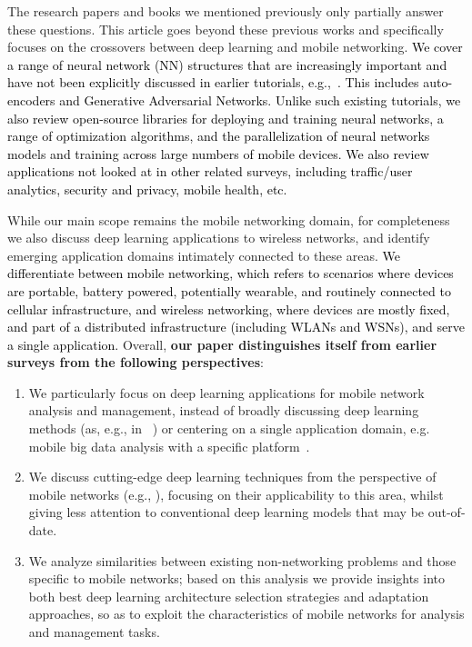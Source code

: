 \documentclass[journal,comsoc,letter]{IEEEtran}
\newcommand{\edit}[1]{\textcolor{black}{#1}}
\begin{document}
The research papers and books we mentioned previously only partially answer these questions.  This article goes beyond these previous works and specifically focuses on the crossovers between deep learning and mobile networking. \edit{We cover a range of neural network (NN) structures that are increasingly important and have not been explicitly discussed in earlier tutorials, e.g.,~\cite{chen2018deep0}. This includes auto-encoders and Generative Adversarial Networks. Unlike such existing tutorials, we also review open-source libraries for deploying and training neural networks, a range of optimization algorithms, and the parallelization of neural networks models and training across large numbers of mobile devices. We also review applications not looked at in other related surveys, including traffic/user analytics, security and privacy, mobile health, etc.} 

While our main scope remains the mobile networking domain, for completeness we also discuss deep learning applications to wireless networks, and identify emerging application domains intimately connected to these areas. \edit{We differentiate between mobile networking, which refers to scenarios where devices are portable, battery powered, potentially wearable, and routinely connected to cellular infrastructure, and wireless networking, where devices are mostly fixed, and part of a distributed infrastructure (including WLANs and WSNs), and serve a single application.} Overall, \textbf{our paper distinguishes itself from earlier surveys from the following perspectives}: 

\begin{enumerate}[label=\emph{(\roman*)}]
\item We particularly focus on deep learning applications for mobile network analysis and management, instead of broadly discussing deep learning methods (as, e.g., in ~\cite{lecun2015deep, schmidhuber2015deep}) or centering on a single application domain, e.g. mobile big data analysis with a specific platform~\cite{alsheikh2016mobile}.

\item We discuss cutting-edge deep learning techniques from the perspective of mobile networks (e.g., \cite{mnih2016asynchronous, arjovsky2017wasserstein}), focusing on their applicability to this area, whilst giving less attention to conventional deep learning models that may be out-of-date.



\item We analyze similarities between existing non-networking problems and those specific to mobile networks; based on this analysis we provide insights into both best deep learning architecture selection strategies and adaptation approaches, so as to exploit the characteristics of mobile networks for analysis and management tasks.
\end{enumerate}
\end{document}
